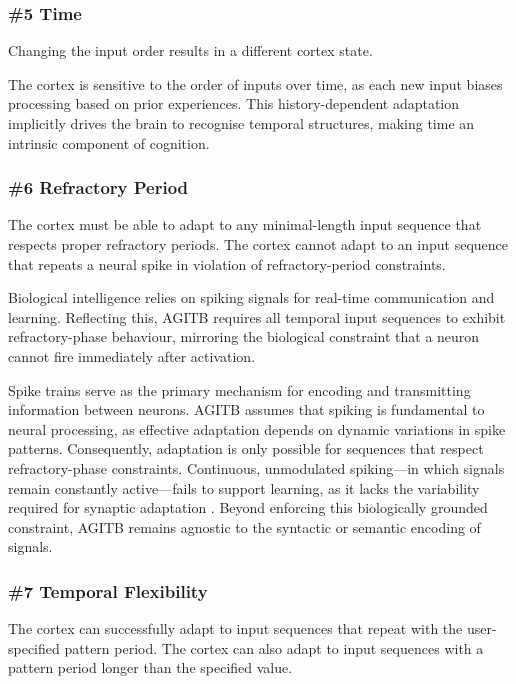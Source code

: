 \documentclass{article}
\newenvironment{one_assertion}[1]
{
  \begin{tabular}{p{1.5cm}p{8.2cm}}
    \textbf{Assertion:} & #1 \\
}{
  \end{tabular}\\
}
\newenvironment{two_assertions}[2]
{
  \begin{tabular}{p{1.5cm}p{8.2cm}}
    \textbf{Assertion:} & #1 \\
    \textbf{Assertion:} & #2 \\
}{
  \end{tabular}\\
}
\begin{document}
\subsubsection*{\#5 Time}
\begin{one_assertion}
    {Changing the input order results in a different cortex state.}
\end{one_assertion}

The cortex is sensitive to the order of inputs over time, as each new input biases processing based on prior experiences. This history-dependent adaptation implicitly drives the brain to recognise temporal structures, making time an intrinsic component of cognition.


\subsubsection*{\#6 Refractory Period}
\begin{two_assertions}
    {The cortex must be able to adapt to any minimal-length input sequence that respects proper refractory periods.}
    {The cortex cannot adapt to an input sequence that repeats a neural spike in violation of refractory-period constraints.}
\end{two_assertions}

Biological intelligence relies on spiking signals for real-time communication and learning. Reflecting this, AGITB requires all temporal input sequences to exhibit refractory-phase behaviour, mirroring the biological constraint that a neuron cannot fire immediately after activation.

Spike trains serve as the primary mechanism for encoding and transmitting information between neurons. AGITB assumes that spiking is fundamental to neural processing, as effective adaptation depends on dynamic variations in spike patterns. Consequently, adaptation is only possible for sequences that respect refractory-phase constraints. Continuous, unmodulated spiking—in which signals remain constantly active—fails to support learning, as it lacks the variability required for synaptic adaptation \cite{Gerstner2002}. Beyond enforcing this biologically grounded constraint, AGITB remains agnostic to the syntactic or semantic encoding of signals.

\subsubsection*{\#7 Temporal Flexibility}
\begin{two_assertions}
    {The cortex can successfully adapt to input sequences that repeat with the user-specified pattern period.}
    {The cortex can also adapt to input sequences with a pattern period longer than the specified value.}
\end{two_assertions}
\end{document}
